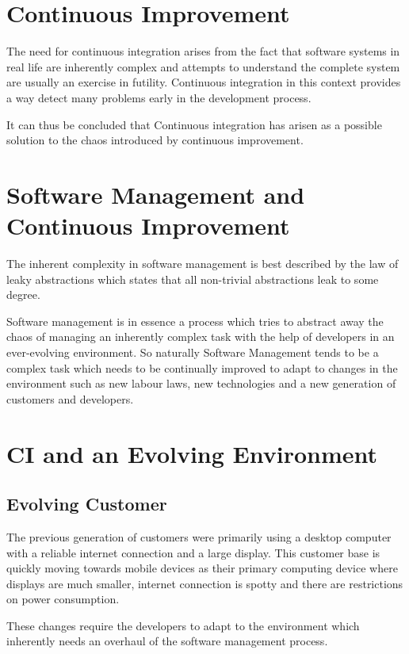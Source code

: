 \documentclass[10pt,conference]{IEEEtran}
\begin{document}
\section*{Continuous Improvement}
The need for continuous integration arises from the fact that software systems in real life are inherently complex\cite{mens_complexity_2012} and attempts to understand the complete system are usually an exercise in futility. Continuous integration in this context provides a way detect many problems early in the development process.

It can thus be concluded that Continuous integration has arisen as a possible solution to the chaos introduced by continuous improvement.

\section*{Software Management and Continuous Improvement}

The inherent complexity in software management is best described by the law of leaky abstractions\cite{spolsky_law_2002} which states that all non-trivial abstractions leak to some degree. 

Software management is in essence a process which tries to abstract away the chaos of managing an inherently complex task with the help of developers in an ever-evolving environment. So naturally Software Management tends to be a complex task which needs to be continually improved to adapt to changes in the environment such as new labour laws, new technologies and a new generation of customers and	 developers. 

\section*{CI and an Evolving Environment}

\subsection*{Evolving Customer}
The previous generation of customers were primarily using a desktop computer with a reliable internet connection and a large display. This customer base is quickly moving towards mobile devices as their primary computing device where displays are much smaller, internet connection is spotty and there are restrictions on power consumption. 

These changes require the developers to adapt to the environment which inherently needs an overhaul of the software management process. 
\end{document}
